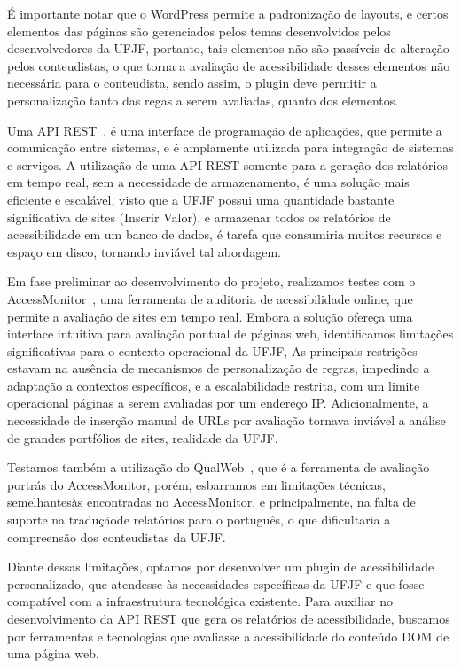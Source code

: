 \documentclass[12pt]{article}
\begin{document}
É importante notar que o WordPress permite a padronização de layouts,
e certos elementos das páginas são gerenciados pelos temas desenvolvidos pelos
desenvolvedores da UFJF, portanto, tais elementos não são passíveis de alteração
pelos conteudistas, o que torna a avaliação de acessibilidade desses elementos
não necessária para o conteudista, sendo assim, o plugin deve permitir a 
personalização tanto das regas a serem avaliadas, quanto dos elementos.

Uma API REST~\autocite{api}, é uma interface de programação de aplicações, que
permite a comunicação entre sistemas, e é amplamente utilizada para integração
de sistemas e serviços. A utilização de uma API REST somente para a geração 
dos relatórios em tempo real, sem a necessidade de armazenamento, é uma 
solução mais eficiente e escalável, visto que a UFJF possui uma quantidade
bastante significativa de sites (Inserir Valor), e armazenar todos os 
relatórios de acessibilidade em um banco de dados, é tarefa que consumiria 
muitos recursos e espaço em disco, tornando inviável tal abordagem.

Em fase preliminar ao desenvolvimento do projeto, realizamos testes com o 
AccessMonitor~\autocite{AM}, 
uma ferramenta de auditoria de acessibilidade online, que permite a avaliação de 
sites em tempo real. Embora a solução ofereça uma interface intuitiva para 
avaliação pontual de páginas web, identificamos limitações significativas para o 
contexto operacional da UFJF, As principais restrições estavam na ausência de 
mecanismos de personalização de regras, impedindo a adaptação a contextos 
específicos, e a escalabilidade restrita, com um limite operacional páginas a 
serem avaliadas por um endereço IP\@. Adicionalmente, a necessidade de inserção 
manual de URLs por avaliação tornava inviável a análise de grandes portfólios de 
sites, realidade da UFJF\@.

Testamos também a utilização do QualWeb~\autocite{qualweb}, que é a ferramenta 
de avaliação portrás do AccessMonitor, porém, esbarramos em limitações técnicas, 
semelhantesàs encontradas no AccessMonitor, e principalmente, na falta de suporte 
na traduçãode relatórios para o português, o que dificultaria a compreensão dos 
conteudistas da UFJF\@.

Diante dessas limitações, optamos por desenvolver um plugin de acessibilidade
personalizado, que atendesse às necessidades específicas da UFJF e que fosse
compatível com a infraestrutura tecnológica existente. Para auxiliar no 
desenvolvimento da API REST que gera os relatórios de acessibilidade, 
buscamos por ferramentas e tecnologias que avaliasse a acessibilidade 
do conteúdo DOM de uma página web.
\end{document}
